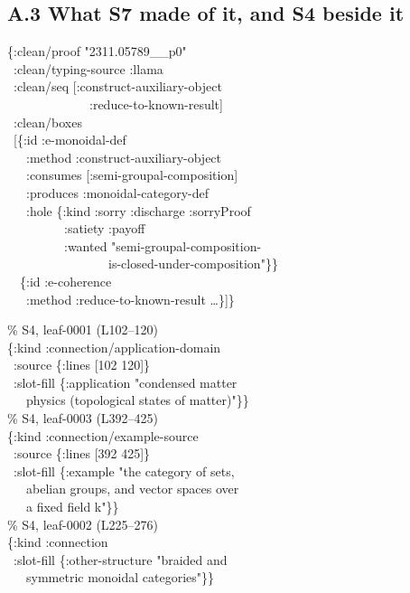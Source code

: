 \subsection*{A.3 What S7 made of it, and S4 beside it}

\begin{center}\small
\begin{minipage}{0.46\textwidth}\ttfamily\footnotesize\raggedright
\{:clean/proof "2311.05789\_\_p0"\\
\ :clean/typing-source :llama\\
\ :clean/seq [:construct-auxiliary-object\\
\ \ \ \ \ \ \ \ \ \ \ \ \ :reduce-to-known-result]\\
\ :clean/boxes\\
\ [\{:id :e-monoidal-def\\
\ \ \ :method :construct-auxiliary-object\\
\ \ \ :consumes [:semi-groupal-composition]\\
\ \ \ :produces :monoidal-category-def\\
\ \ \ :hole \{:kind :sorry :discharge :sorryProof\\
\ \ \ \ \ \ \ \ \ :satiety :payoff\\
\ \ \ \ \ \ \ \ \ :wanted "semi-groupal-composition-\\
\ \ \ \ \ \ \ \ \ \ \ \ \ \ \ \ is-closed-under-composition"\}\}\\
\ \ \{:id :e-coherence\\
\ \ \ :method :reduce-to-known-result \dots\}]\}
\end{minipage}\hfill
\begin{minipage}{0.46\textwidth}\ttfamily\footnotesize\raggedright
\% S4, leaf-0001 (L102--120)\\
\{:kind :connection/application-domain\\
\ :source \{:lines [102 120]\}\\
\ :slot-fill \{:application "condensed matter\\
\ \ \ physics (topological states of matter)"\}\}\\[6pt]
\% S4, leaf-0003 (L392--425)\\
\{:kind :connection/example-source\\
\ :source \{:lines [392 425]\}\\
\ :slot-fill \{:example "the category of sets,\\
\ \ \ abelian groups, and vector spaces over\\
\ \ \ a fixed field k"\}\}\\[6pt]
\% S4, leaf-0002 (L225--276)\\
\{:kind :connection\\
\ :slot-fill \{:other-structure "braided and\\
\ \ \ symmetric monoidal categories"\}\}
\end{minipage}
\end{center}

